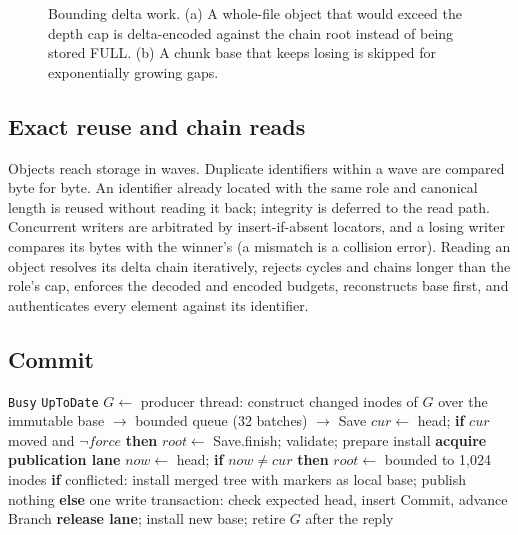 \begin{figure}[h]
\centering
\resizebox{\linewidth}{!}{}
\caption{Bounding delta work. (a) A whole-file object that would exceed the depth cap is delta-encoded against the chain root instead of being stored FULL. (b) A chunk base that keeps losing is skipped for exponentially growing gaps.}
\label{fig:deltachain}
\end{figure}

\subsection{Exact reuse and chain reads}

Objects reach storage in waves. Duplicate identifiers within a wave are compared byte for
byte. An identifier already located with the same role and canonical length is reused
without reading it back; integrity is deferred to the read path. Concurrent writers are
arbitrated by insert-if-absent locators, and a losing writer compares its bytes with the
winner's (a mismatch is a collision error). Reading an object resolves its delta chain
iteratively, rejects cycles and chains longer than the role's cap, enforces the decoded
and encoded budgets, reconstructs base first, and authenticates every element against
its identifier.

\subsection{Commit}

\begin{algorithm}[h]
\caption{Commit of a \ws{}}
\label{alg:commit}
\small
\begin{algorithmic}[1]
   \Return \texttt{Busy} \EndIf
   \Return \texttt{UpToDate} \EndIf
  \State $G \gets$  
  \State producer thread: construct changed inodes of $G$ over the immutable base $\rightarrow$ bounded queue (32 batches) $\rightarrow$ Save
  \State $\mathit{cur} \gets$ head; \textbf{if} $\mathit{cur}$ moved and $\neg\mathit{force}$ \textbf{then} $\mathit{root} \gets$ 
  \State Save.finish; validate; prepare install
  \State \textbf{acquire publication lane}
  \State \quad $\mathit{now} \gets$ head; \textbf{if} $\mathit{now} \neq \mathit{cur}$ \textbf{then} $\mathit{root} \gets$  bounded to 1,024 inodes
  \State \quad \textbf{if} conflicted: install merged tree with markers as local base; publish nothing
  \State \quad \textbf{else} one write transaction: check expected head, insert Commit, advance Branch
  \State \textbf{release lane}; install new base; retire $G$ after the reply
\EndFunction
\end{algorithmic}
\end{algorithm}

